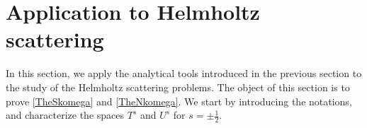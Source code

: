 \documentclass[a4paper]{article}
\begin{document}


\section{Application to Helmholtz scattering}

In this section, we apply the analytical tools introduced in the previous section to the study of the Helmholtz scattering problems. The object of this section is to prove \autoref{TheSkomega} and \autoref{TheNkomega}. We start by introducing the notations, and characterize the spaces $T^s$ and $U^s$ for $s = \pm \frac{1}{2}$. 
\end{document}
